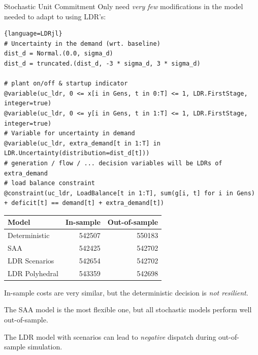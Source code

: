 \documentclass[a0paper,fontscale=0.285]{baposter} %
\begin{document}
\begin{poster}

\begin{posterbox}[name=example2,column=1,span=2,below=example1]
{Stochastic Unit Commitment}
Only need \emph{very few} modifications in the model needed to adapt to using LDR's:

  { \footnotesize
  \begin{lstlisting}{language=LDRjl}
# Uncertainty in the demand (wrt. baseline)
dist_d = Normal.(0.0, sigma_d)
dist_d = truncated.(dist_d, -3 * sigma_d, 3 * sigma_d)

# plant on/off & startup indicator
@variable(uc_ldr, 0 <= x[i in Gens, t in 0:T] <= 1, LDR.FirstStage, integer=true)
@variable(uc_ldr, 0 <= y[i in Gens, t in 1:T] <= 1, LDR.FirstStage, integer=true)
# Variable for uncertainty in demand
@variable(uc_ldr, extra_demand[t in 1:T] in LDR.Uncertainty(distribution=dist_d[t]))
# generation / flow / ... decision variables will be LDRs of extra_demand
# load balance constraint
@constraint(uc_ldr, LoadBalance[t in 1:T], sum(g[i, t] for i in Gens) + deficit[t] == demand[t] + extra_demand[t])
  \end{lstlisting} }

  \begin{center}
    \begin{tabular}{lrr}
      \toprule
      Model & In-sample & Out-of-sample \\ \midrule
      Deterministic  & 542507 & 550183 \\
      SAA            & 542425 & 542702 \\
      LDR Scenarios  & 542654 & 542702 \\
      LDR Polyhedral & 543359 & 542698 \\ \bottomrule
    \end{tabular}
  \end{center}

  In-sample costs are very similar, but the deterministic decision is \emph{not resilient}.

  The SAA model is the most flexible one, but all stochastic models perform well
  out-of-sample.

  The LDR model with scenarios can lead to \emph{negative} dispatch during out-of-sample simulation.


\end{posterbox}
\end{poster}
\end{document}
